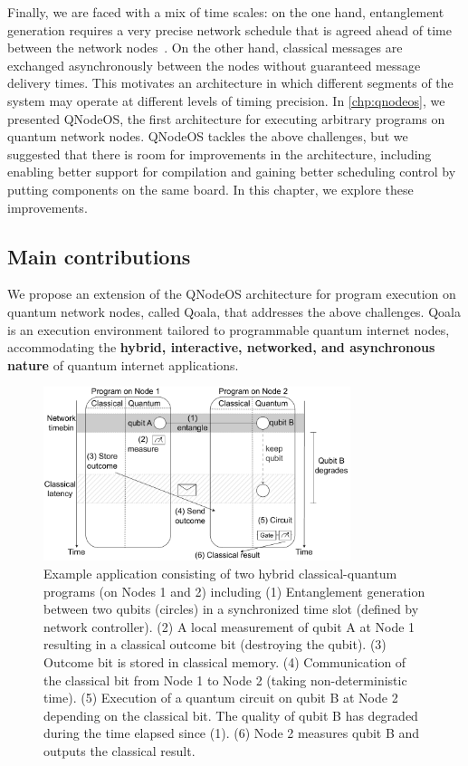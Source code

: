 Finally, we are faced with a mix of time scales:
on the one hand, entanglement generation requires a very precise network schedule that is agreed ahead of time between the network nodes~\cite{dahlberg2019link}. On the other hand, classical messages are exchanged asynchronously between the nodes without guaranteed message delivery times. This motivates an architecture in which different segments of the system may operate at different levels of timing precision. 
In \cref{chp:qnodeos}, we presented QNodeOS, the first architecture for executing arbitrary programs on quantum network nodes.
QNodeOS tackles the above challenges, but we suggested that there is room for improvements in the architecture, including enabling better support for compilation and gaining better scheduling control by putting components on the same board.
In this chapter, we explore these improvements.


\subsection{Main contributions}
We propose an extension of the QNodeOS architecture for program execution on quantum network nodes, called Qoala, that addresses the above challenges.
Qoala is an execution environment tailored to programmable quantum internet nodes, accommodating the \textbf{hybrid, interactive, networked, and asynchronous nature} of quantum internet applications. 

\begin{figure}[t]
    \centering
    \includegraphics[width=0.8\textwidth]{figures/qoala/program_illustration.pdf}
    \caption{Example application consisting of two hybrid classical-quantum programs (on Nodes 1 and 2) including
        (1) Entanglement generation between two qubits (circles) in a synchronized time slot (defined by  network controller).
        (2) A local measurement of qubit A at Node 1 resulting in a classical outcome bit (destroying the qubit).
        (3) Outcome bit is stored in classical memory.
        (4) Communication of the classical bit from Node 1 to Node 2 (taking non-deterministic time).
        (5) Execution of a quantum circuit on qubit B at Node 2 depending on the classical bit. The quality of qubit B has degraded during the time elapsed since (1). 
        (6) Node 2 measures qubit B and outputs the classical result.
    }
    \label{qoala:fig:program_illustration}
\end{figure}

